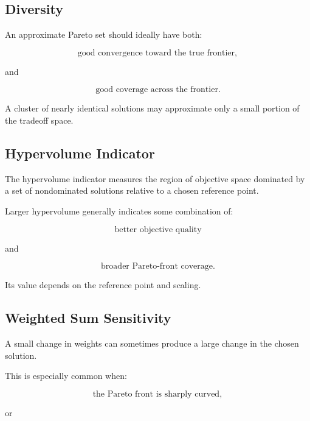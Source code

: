 \subsection{Diversity}
\label{subsec:pareto-diversity}

An approximate Pareto set should ideally have both:

\[
\boxed{
\text{good convergence toward the true frontier},
}
\]

and

\[
\boxed{
\text{good coverage across the frontier}.
}
\]

A cluster of nearly identical solutions may approximate only a small
portion of the tradeoff space.

\subsection{Hypervolume Indicator}
\label{subsec:hypervolume-indicator}

The hypervolume indicator measures the region of objective space dominated
by a set of nondominated solutions relative to a chosen reference point.

Larger hypervolume generally indicates some combination of:

\[
\boxed{
\text{better objective quality}
}
\]

and

\[
\boxed{
\text{broader Pareto-front coverage}.
}
\]

Its value depends on the reference point and scaling.

\subsection{Weighted Sum Sensitivity}
\label{subsec:weight-sensitivity}

A small change in weights can sometimes produce a large change in the
chosen solution.

This is especially common when:

\[
\boxed{
\text{the Pareto front is sharply curved},
}
\]

or


